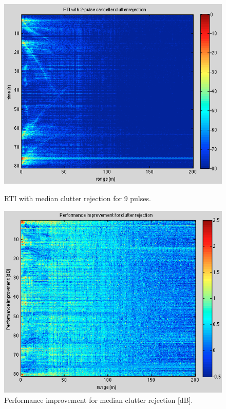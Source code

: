 \documentclass{article}
\begin{document}
\begin{figure}[htb]
\begin{minipage}[b]{0.5\linewidth}
\centering
\includegraphics[width=\textwidth]{Figures/median_rejection.png}
\caption{RTI with median clutter rejection for 9 pulses.}
\label{fig:median_rejection}
\end{minipage}
\begin{minipage}[b]{0.5\linewidth}
\centering
\includegraphics[width=\textwidth]{Figures/median_improvment.png}
\caption{Performance improvement for median clutter rejection [dB].}
\label{fig:median_improvment}
\end{minipage}
\end{figure}
\end{document}
